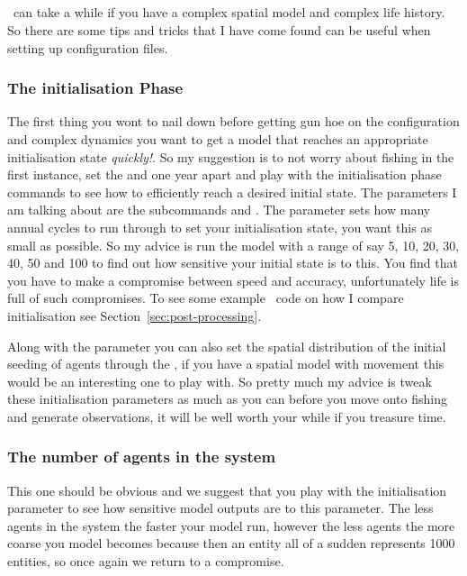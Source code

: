 	
\subsection{\label{sec:tips}}
\IBM\ can take a while if you have a complex spatial model and complex life history. So there are some tips and tricks that I have come found can be useful when setting up configuration files.

\subsubsection*{The initialisation Phase}
The first thing you wont to nail down before getting gun hoe on the configuration and complex dynamics you want to get a model that reaches an appropriate initialisation state \emph{quickly!}. So my suggestion is to not worry about fishing in the first instance, set the  and  one year apart and play with the initialisation phase commands to see how to efficiently reach a desired initial state. The parameters I am talking about are the subcommands  and . The  parameter sets how many annual cycles to run through to set your initialisation state, you want this as small as possible. So my advice is run the model with a range of  say 5, 10, 20, 30, 40, 50 and 100 to find out how sensitive your initial state is to this. You find that you have to make a compromise between speed and accuracy, unfortunately life is full of such compromises. To see some example \R\ code on how I compare initialisation see Section~\ref{sec:post-processing}.

Along with the  parameter you can also set the spatial distribution of the initial seeding of agents through the , if you have a spatial model with movement this would be an interesting one to play with. So pretty much my advice is tweak these initialisation parameters as much as you can before you move onto fishing and generate observations, it will be well worth your while if you treasure time.

\subsubsection*{The number of agents in the system} 
This one should be obvious and we suggest that you play with the initialisation parameter  to see how sensitive model outputs are to this parameter. The less agents in the system the faster your model run, however the less agents the more coarse you model becomes because then an entity all of a sudden represents 1000 entities, so once again we return to a compromise.

